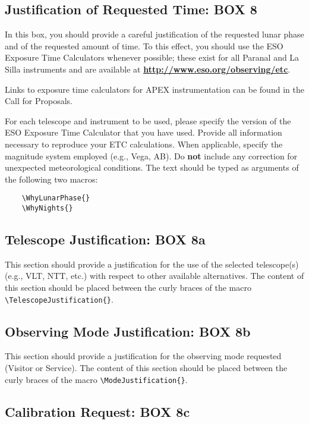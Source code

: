 \documentclass{article}
\begin{document}
\subsection{Justification of Requested Time: {\bf BOX 8}}

In this box, you should provide a careful justification of the
requested lunar phase and of the requested amount of time. 
To this effect, you should use the ESO Exposure
Time Calculators whenever possible; these exist for all Paranal and La Silla
instruments and are available at
\href{http://www.eso.org/observing/etc}{\bf\underline{http://www.eso.org/observing/etc}}. 

Links to exposure time calculators for APEX instrumentation can be found in the Call for Proposals.

For each telescope and instrument to be used, please specify the
version of the ESO Exposure Time Calculator that you have
used. Provide all information necessary to reproduce your ETC calculations. When applicable, specify the magnitude system employed (e.g., Vega, AB). Do {\bf not} include any correction for unexpected
meteorological conditions. The text should be typed as arguments of
the following two macros:
\begin{verbatim}
    \WhyLunarPhase{}
    \WhyNights{}
\end{verbatim} 

\subsection{Telescope Justification: {\bf BOX 8a}}
This section should provide a justification for the use of the selected telescope(s) (e.g., VLT, NTT, etc.) with respect to other available alternatives. The content of this section should be placed between the curly
braces of the macro \verb|\TelescopeJustification{}|.

\subsection{Observing Mode Justification: {\bf BOX 8b}}
This section should provide a justification for the observing mode requested (Visitor or Service). The content of this section should be placed between the curly braces of the macro \verb|\ModeJustification{}|.

\subsection{Calibration Request: {\bf BOX 8c}}
\end{document}
